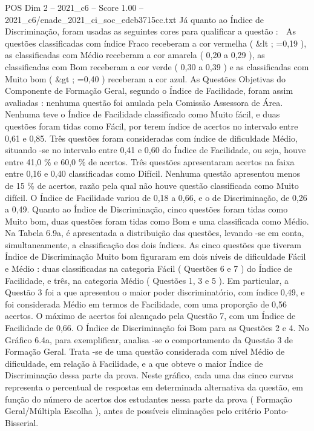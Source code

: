 \begin{textsample}{POS Dim 2 – 2021\_c6 – Score 1.00 – 2021\_c6/enade\_2021\_ci\_soc\_edcb3715cc.txt}
Já quanto ao Índice de Discriminação, foram usadas as seguintes cores para qualificar a questão :  As questões classificadas com índice Fraco receberam a cor vermelha ( \&lt ; =0,19 ), as classificadas com Médio receberam a cor amarela ( 0,20 a 0,29 ), as classificadas com Bom receberam a cor verde ( 0,30 a 0,39 ) e as classificadas com Muito bom ( \&gt ; =0,40 ) receberam a cor azul.
As Questões Objetivas do Componente de Formação Geral, segundo o Índice de Facilidade, foram assim avaliadas : nenhuma questão foi anulada pela Comissão Assessora de Área.
Nenhuma teve o Índice de Facilidade classificado como Muito fácil, e duas questões foram tidas como Fácil, por terem índice de acertos no intervalo entre 0,61 e 0,85.
Três questões foram consideradas com índice de dificuldade Médio, situando -se no intervalo entre 0,41 e 0,60 do Índice de Facilidade, ou seja, houve entre 41,0 \% e 60,0 \% de acertos.
Três questões apresentaram acertos na faixa entre 0,16 e 0,40 classificadas como Difícil.
Nenhuma questão apresentou menos de 15 \% de acertos, razão pela qual não houve questão classificada como Muito difícil.
O Índice de Facilidade variou de 0,18 a 0,66, e o de Discriminação, de 0,26 a 0,49.
Quanto ao Índice de Discriminação, cinco questões foram tidas como Muito bom, duas questões foram tidas como Bom e uma classificada como Médio.
Na Tabela 6.9a, é apresentada a distribuição das questões, levando -se em conta, simultaneamente, a classificação dos dois índices.
As cinco questões que tiveram Índice de Discriminação Muito bom figuraram em dois níveis de dificuldade Fácil e Médio : duas classificadas na categoria Fácil ( Questões 6 e 7 ) do Índice de Facilidade, e três, na categoria Médio ( Questões 1, 3 e 5 ).
Em particular, a Questão 3 foi a que apresentou o maior poder discriminatório, com índice 0,49, e foi considerada Médio em termos de Facilidade, com uma proporção de 0,56 acertos.
O máximo de acertos foi alcançado pela Questão 7, com um Índice de Facilidade de 0,66.
O Índice de Discriminação foi Bom para as Questões 2 e 4.
No Gráfico 6.4a, para exemplificar, analisa -se o comportamento da Questão 3 de Formação Geral.
Trata -se de uma questão considerada com nível Médio de dificuldade, em relação à Facilidade, e a que obteve o maior Índice de Discriminação dessa parte da prova.
Neste gráfico, cada uma das cinco curvas representa o percentual de respostas em determinada alternativa da questão, em função do número de acertos dos estudantes nessa parte da prova ( Formação Geral/Múltipla Escolha ), antes de possíveis eliminações pelo critério Ponto-Bisserial.

\end{textsample}
